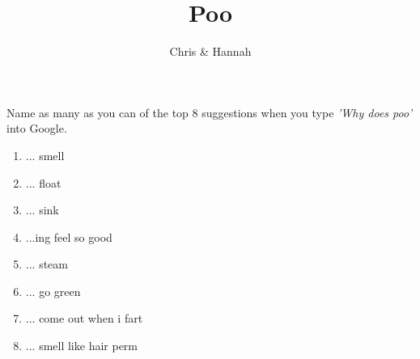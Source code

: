\documentclass[answers]{exam}
\title{Poo\vspace{-2ex}}
\author{Chris \& Hannah\vspace{-2ex}}
\begin{document}
\maketitle
\vspace{5mm}

\begin{questions}

    \question Name as many as you can of the top 8 suggestions when you type \emph{'Why does poo'} into Google.
    
    \begin{solution}
        \begin{enumerate}
            \item ... smell
            \item ... float
            \item ... sink
            \item ...ing feel so good
            \item ... steam
            \item ... go green
            \item ... come out when i fart
            \item ... smell like hair perm
        \end{enumerate}
    \end{solution}

\end{questions}
\end{document}

